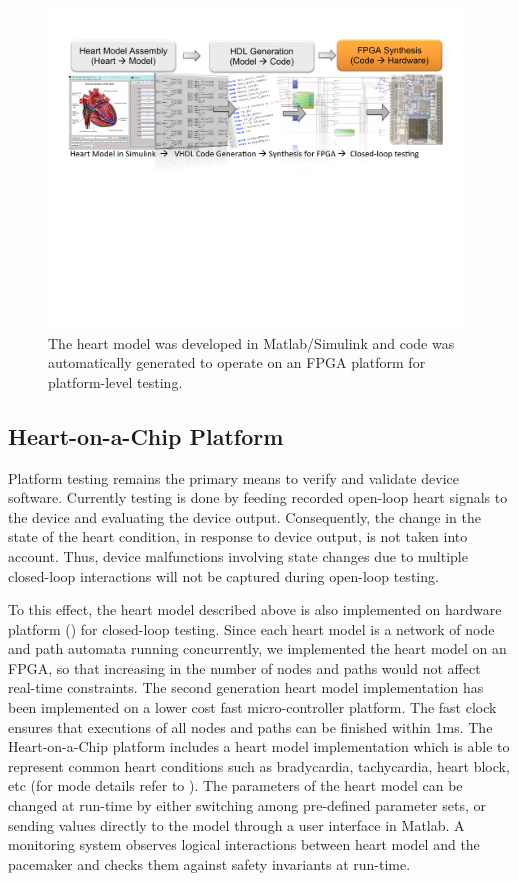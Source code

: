 \begin{figure}[!t]
\center
		\includegraphics[width=0.98\textwidth]{figs/modeling_heart.pdf}
\caption{The heart model was developed in Matlab/Simulink and code was automatically generated to operate on an FPGA platform for platform-level testing.}
\label{fig:modeling_heart}
\end{figure}
\subsection{Heart-on-a-Chip Platform}
Platform testing remains the primary means to verify and validate device software. Currently testing is done by feeding recorded open-loop heart signals to the device and evaluating the device output. Consequently, the change in the state of the heart condition, in response to device output, is not taken into account. Thus, device malfunctions involving state changes due to multiple closed-loop interactions will not be captured during open-loop testing. 

To this effect, the heart model described above is also implemented on hardware platform () for closed-loop testing. Since each heart model is a network of node and path automata running concurrently, we implemented the heart model on an FPGA, so that increasing in the number of nodes and paths would not affect real-time constraints. The second generation heart model implementation has been implemented on a lower cost fast micro-controller platform. The fast clock ensures that executions of all nodes and paths can be finished within 1ms. The Heart-on-a-Chip platform includes a heart model implementation which is able to represent common heart conditions such as bradycardia, tachycardia, heart block, etc (for mode details refer to \cite{VHM_proc}). The parameters of the heart model can be changed at run-time by either switching among pre-defined parameter sets, or sending values directly to the model through a user interface in Matlab. A monitoring system observes logical interactions between heart model and the pacemaker and checks them against safety invariants at run-time. 

